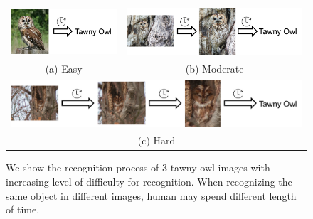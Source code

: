\documentclass[10pt,twocolumn,letterpaper]{article}
\begin{document}

\setlength{\tabcolsep}{1pt}
\begin{figure}
\begin{center}
  \begin{tabular}{c|cc}
    \includegraphics[width=0.38\linewidth]{figs/tawny_owl/easy1.pdf} &
    \multicolumn{2}{c}{\includegraphics[width=0.62\linewidth]{figs/tawny_owl/hard1.pdf}}  \\
    (a) Easy & \multicolumn{2}{c}{(b) Moderate} \\
    \midrule
    \multicolumn{3}{c}{\includegraphics[width=1\linewidth,height=0.17\linewidth]{figs/tawny_owl/extreme1.pdf}} \\
    \multicolumn{3}{c}{(c) Hard}
  \end{tabular}
  \vspace{1pt}
\end{center}
\caption{We show the recognition process of 3 tawny owl images with increasing level of difficulty for recognition.
When recognizing the same object in different images, human may spend different length of time.}
\label{fig:splash}
\end{figure}
\end{document}
